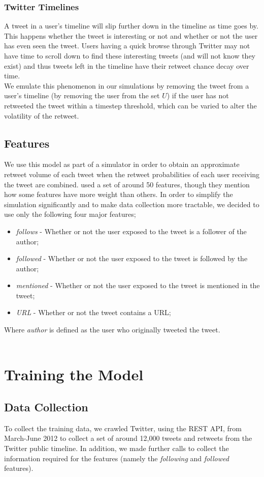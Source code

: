 \subsubsection{Twitter Timelines}
A tweet in a user's timeline will slip further down in the timeline as time goes by. This happens whether the tweet is interesting or not and whether or not the user has even seen the tweet.  Users having a quick browse through Twitter may not have time to scroll down to find these interesting tweets (and will not know they exist) and thus tweets left in the timeline have their retweet chance decay over time.
\\
We emulate this phenomenon in our simulations by removing the tweet from a user's timeline (by removing the user from the set $U$) if the user has not retweeted the tweet within a timestep threshold, which can be varied to alter the volatility of the retweet.

\subsection{Features}
We use this model as part of a simulator in order to obtain an approximate retweet volume of each tweet when the retweet probabilities of each user receiving the tweet are combined. \cite{zhu11} used a set of around 50 features, though they mention how some features have more weight than others. In order to simplify the simulation significantly and to make data collection more tractable, we decided to use only the following four major features;
\begin{itemize}
\item \emph{follows} - Whether or not the user exposed to the tweet is a follower of the author;
\item \emph{followed} - Whether or not the user exposed to the tweet is followed by the author;
\item \emph{mentioned} - Whether or not the user exposed to the tweet is mentioned in the tweet;
\item \emph{URL} - Whether or not the tweet contains a URL;
\end{itemize}
Where \emph{author} is defined as the user who originally tweeted the tweet.
\\ \\ 


\section{Training the Model}
\subsection{Data Collection}
To collect the training data, we crawled Twitter, using the REST API, from March-June 2012 to collect a set of around 12,000 tweets and retweets from the Twitter public timeline. In addition, we made further calls to collect the information required for the features (namely the \textit{following} and \textit{followed} features). 

